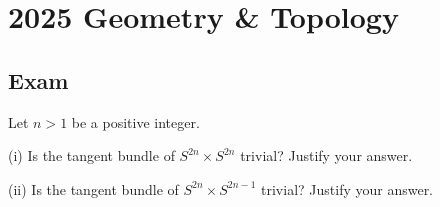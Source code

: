 \section{2025 Geometry \& Topology}

\subsection{Exam}

\begin{exercise}
\label{geometry:2025:1}
Let $n > 1$ be a positive integer.

(i) Is the tangent bundle of $S^{2n} \times S^{2n}$ trivial? Justify your answer.

(ii) Is the tangent bundle of $S^{2n} \times S^{2n-1}$ trivial? Justify your answer.
\end{exercise}

